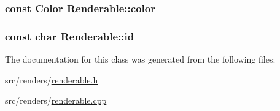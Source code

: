 \subsubsection[{\texorpdfstring{color}{color}}]{\setlength{\rightskip}{0pt plus 5cm}const {\bf Color} Renderable\+::color\hspace{0.3cm}{\ttfamily [protected]}}\hypertarget{classRenderable_a39a92825db6a8b7ee9222e1996fb76b8}{}\label{classRenderable_a39a92825db6a8b7ee9222e1996fb76b8}
\subsubsection[{\texorpdfstring{id}{id}}]{\setlength{\rightskip}{0pt plus 5cm}const char Renderable\+::id\hspace{0.3cm}{\ttfamily [protected]}}\hypertarget{classRenderable_aaeefc7f2354d673f7de6ec3778f31e94}{}\label{classRenderable_aaeefc7f2354d673f7de6ec3778f31e94}


The documentation for this class was generated from the following files\+:\begin{DoxyCompactItemize}
\item 
src/renders/\hyperlink{renderable_8h}{renderable.\+h}\item 
src/renders/\hyperlink{renderable_8cpp}{renderable.\+cpp}\end{DoxyCompactItemize}

